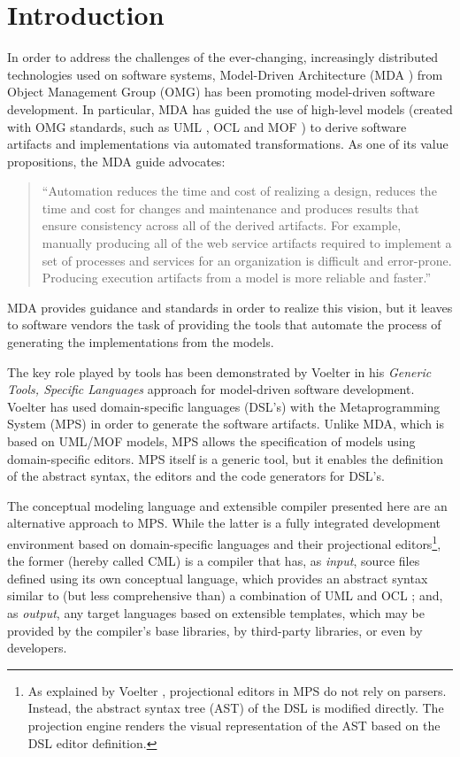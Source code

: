 \section{Introduction}
%
In order to address the challenges of the ever-changing,
increasingly distributed technologies used on software systems,
Model-Driven Architecture (MDA \cite{mda}) from Object Management Group (OMG)
has been promoting model-driven software development.
In particular, MDA has guided the use of high-level models (created with OMG standards,
such as UML \cite{uml}, OCL \cite{ocl} and MOF \cite{mof}) to derive software artifacts and implementations via automated transformations.
As one of its value propositions, the MDA guide \cite{mda} advocates:

\begin{quote}``Automation reduces the time and cost of realizing a design,
reduces the time and cost for changes and maintenance and produces results that ensure consistency across all of the derived artifacts.
For example, manually producing all of the web service artifacts required to implement a set of processes and services for an organization is difficult and error-prone.
Producing execution artifacts from a model is more reliable and faster.''\end{quote} 

MDA provides guidance and standards in order to realize this vision,
but it leaves to software vendors the task of providing the tools that automate the process of generating the implementations from the models.

The key role played by tools has been demonstrated by Voelter \cite{voelter} in his \emph{Generic Tools, Specific Languages} approach for model-driven software development.
Voelter \cite{voelter} has used domain-specific languages (DSL's) with the Metaprogramming System (MPS) in order to generate the software artifacts.
Unlike MDA, which is based on UML/MOF models,
MPS allows the specification of models using domain-specific editors.
MPS itself is a generic tool,
but it enables the definition of the abstract syntax, the editors and the code generators for DSL's.

The conceptual modeling language and extensible compiler presented here are an alternative approach to MPS.
While the latter is a fully integrated development environment based on domain-specific languages and their projectional editors\footnote{As explained by Voelter \cite{voelter}, projectional editors in MPS do not rely on parsers.
Instead, the abstract syntax tree (AST) of the DSL is modified directly.
The projection engine renders the visual representation of the AST based on the DSL editor definition.},
the former (hereby called CML) is a compiler that has,
as \emph{input}, source files defined using its own conceptual language,
which provides an abstract syntax similar to (but less comprehensive than) a combination of UML \cite{uml} and OCL \cite{ocl}; 
and, as \emph{output}, any target languages based on extensible templates,
which may be provided by the compiler's base libraries, by third-party libraries, or even by developers.

